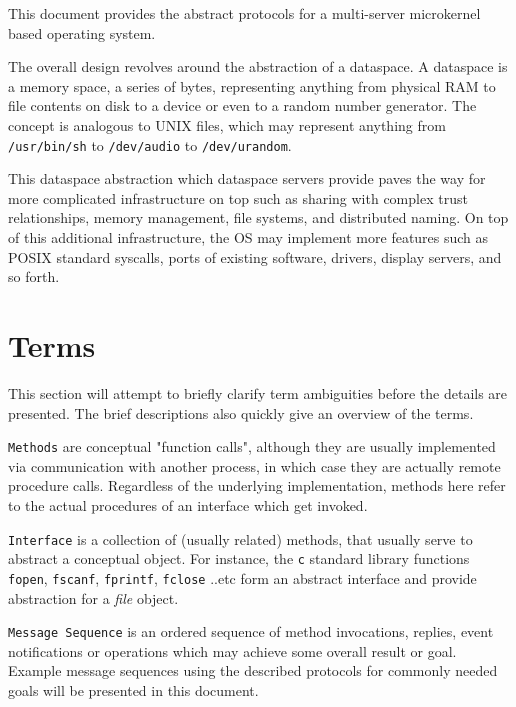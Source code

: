 %
%
%
%

This document provides the abstract protocols for a multi-server microkernel based operating system.

The overall design revolves around the abstraction of a dataspace. A dataspace is a memory space, a
series of bytes, representing anything from physical RAM to file contents on disk to a device or
even to a random number generator. The concept is analogous to UNIX files, which may represent
anything from \texttt{/usr/bin/sh} to \texttt{/dev/audio} to \texttt{/dev/urandom}.

This dataspace abstraction which dataspace servers provide paves the way for more complicated
infrastructure on top such as sharing with complex trust relationships, memory management, file
systems, and distributed naming. On top of this additional infrastructure, the OS may implement more
features such as POSIX standard syscalls, ports of existing software, drivers, display servers, and
so forth.

\section{Terms}

This section will attempt to briefly clarify term ambiguities before the details
are presented. The brief descriptions also quickly give an overview of the
terms.

\texttt{Methods} are conceptual "function calls", although they are usually
implemented via communication with another process, in which case they are
actually remote procedure calls. Regardless of the underlying implementation,
methods here refer to the actual procedures of an interface which get invoked.

\texttt{Interface} is a collection of (usually related) methods, that
usually serve to abstract a conceptual object. For instance, the \texttt{c}
standard library functions \texttt{fopen}, \texttt{fscanf}, \texttt{fprintf},
\texttt{fclose} ..etc form an abstract interface and provide abstraction for a
\emph{file} object.

\texttt{Message Sequence} is an ordered sequence of method invocations,
replies, event notifications or operations which may achieve some overall
result or goal.  Example message sequences using the described protocols for
commonly needed goals will be presented in this document.

